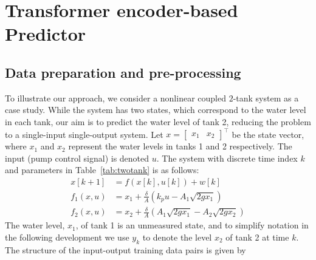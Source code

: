 \documentclass{ifacconf}
\begin{document}
\section{Transformer encoder-based Predictor}\label{sec:TFE}

\subsection{Data preparation and pre-processing} 
To illustrate our approach, we consider a nonlinear coupled $2$-tank system as a case study. While the system has two states, which correspond to the water level in each tank, our aim is to predict the water level of tank 2, reducing the problem to a single-input single-output system. Let \( x = [\begin{matrix} x_1 & x_2 \end{matrix}]^\top \) be the state vector, where \( x_1 \) and \( x_2 \) represent the water levels in tanks 1 and 2 respectively. The input (pump control signal) is denoted \( u\). The system with discrete time index $k$ and  parameters in Table~\ref{tab:twotank} 
is as follows:
\begin{equation}
\label{fun:siso}
  \begin{aligned}
    x[k+1] &= f(x[k], u[k]) + w[k]\\
    f_1(x, u) &= x_1 + \frac{\delta}{A} \left( k_p u - A_1 \sqrt{2 g x_1} \right) \\
    f_2(x, u) &= x_2 + \frac{\delta}{A} \left( A_1 \sqrt{2 g x_1} - A_2 \sqrt{2 g x_2} \right) 
  \end{aligned}
\end{equation}
%
The water level, \(x_1\), of tank 1 is an unmeasured state, and to simplify notation in the following development we use \(y_k\) to denote the level $x_2$ of tank 2 at time $k$. 
%
The structure of the input-output training data pairs is given by
\end{document}
